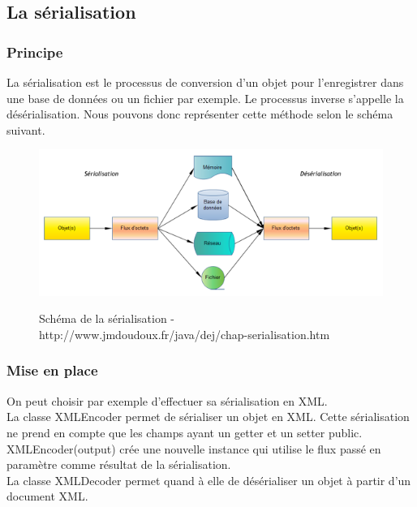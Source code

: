 \subsection{La sérialisation}

\subsubsection{Principe}

La sérialisation est le processus de conversion d'un objet pour l'enregistrer dans une base de données ou un fichier par exemple. Le processus inverse s'appelle la désérialisation. Nous pouvons donc représenter cette méthode selon le schéma suivant. 

\begin{figure}[!h]
  \center
  \includegraphics[scale=0.5]{../graph/serialisation.png} \\
  \caption{Schéma de la sérialisation - http://www.jmdoudoux.fr/java/dej/chap-serialisation.htm}
\end{figure}

\subsubsection{Mise en place}
On peut choisir par exemple d'effectuer sa sérialisation en XML. \\

La classe XMLEncoder permet de sérialiser un objet en XML. Cette sérialisation ne prend en compte que les champs ayant un getter et un setter public. XMLEncoder(output) crée une nouvelle instance qui utilise le flux passé en paramètre comme résultat de la sérialisation. \\

La classe XMLDecoder permet quand à elle de désérialiser un objet à partir d'un document XML. \\

